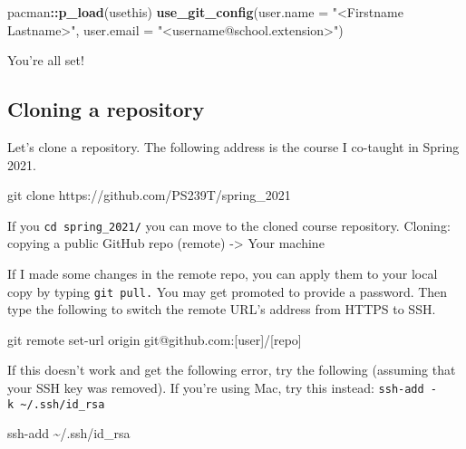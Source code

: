 \documentclass[
]{book}
\newenvironment{Shaded}{\begin{snugshade}}{\end{snugshade}}
\newcommand{\DataTypeTok}[1]{\textcolor[rgb]{0.13,0.29,0.53}{#1}}
\newcommand{\FunctionTok}[1]{\textcolor[rgb]{0.00,0.00,0.00}{#1}}
\newcommand{\KeywordTok}[1]{\textcolor[rgb]{0.13,0.29,0.53}{\textbf{#1}}}
\newcommand{\NormalTok}[1]{#1}
\newcommand{\OperatorTok}[1]{\textcolor[rgb]{0.81,0.36,0.00}{\textbf{#1}}}
\newcommand{\StringTok}[1]{\textcolor[rgb]{0.31,0.60,0.02}{#1}}
\begin{document}
\begin{Shaded}
\begin{Highlighting}[]
\NormalTok{pacman}\OperatorTok{::}\KeywordTok{p\_load}\NormalTok{(usethis)}
\KeywordTok{use\_git\_config}\NormalTok{(}\DataTypeTok{user.name =} \StringTok{"\textless{}Firstname Lastname\textgreater{}"}\NormalTok{,}
               \DataTypeTok{user.email =} \StringTok{"\textless{}username@school.extension\textgreater{}"}\NormalTok{)}
\end{Highlighting}
\end{Shaded}

You're all set!

\hypertarget{cloning-a-repository}{%
\subsection{Cloning a repository}\label{cloning-a-repository}}

Let's clone a repository. The following address is the course I co-taught in Spring 2021.

\begin{Shaded}
\begin{Highlighting}[]
\FunctionTok{git}\NormalTok{ clone https://github.com/PS239T/spring\_2021}
\end{Highlighting}
\end{Shaded}

If you \texttt{cd\ spring\_2021/} you can move to the cloned course repository. Cloning: copying a public GitHub repo (remote) -\textgreater{} Your machine

If I made some changes in the remote repo, you can apply them to your local copy by typing \texttt{git\ pull.} You may get promoted to provide a password. Then type the following to switch the remote URL's address from HTTPS to SSH.

\begin{Shaded}
\begin{Highlighting}[]
\FunctionTok{git}\NormalTok{ remote set{-}url origin git@github.com:[user]/[repo]}
\end{Highlighting}
\end{Shaded}

If this doesn't work and get the following error, try the following (assuming that your SSH key was removed). If you're using Mac, try this instead: \texttt{ssh-add\ -k\ \textasciitilde{}/.ssh/id\_rsa}

\begin{Shaded}
\begin{Highlighting}[]
\FunctionTok{ssh{-}add}\NormalTok{ \textasciitilde{}/.ssh/id\_rsa}
\end{Highlighting}
\end{Shaded}
\end{document}
